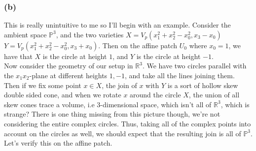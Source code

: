 \documentclass{article}
\theoremstyle{definition}
\newcommand{\R}{\mathbb{R}}
\renewcommand{\P}{\mathbb{P}}
\newcommand{\PP}[1]{\P^{#1}}
\begin{document}
\subsubsection*{(b)}

This is really unintuitive to me so I'll begin with an example. Consider the
ambient space $\PP{3}$, and the two varieties $X = V_p(x_1^2 + x_2^2 - x_0^2,
x_3 - x_0)$ $Y = V_p(x_1^2 + x_2^2 - x_0^2, x_3 + x_0)$. Then on the affine
patch $U_0$ where $x_0 = 1$, we have that $X$ is the circle at height $1$, and
$Y$ is the circle at height $-1$. \\

Now consider the geometry of our setup in $\R^{3}$. We have two circles
parallel with the $x_1x_2$-plane at different heights $1, -1$, and take all the
lines joining them. Then if we fix some point $x \in X$, the join of $x$ with
$Y$ is a sort of hollow skew double sided cone, and when we rotate $x$ around
the circle $X$, the union of all skew cones trace a volume, i.e $3$-dimensional
space, which isn't all of $\R^3$, which is strange? There is one thing missing
from this picture though, we're not considering the entire complex circles.
Thus, taking all of the complex points into account on the circles as well, we
should expect that the resulting join is all of $\PP{3}$. Let's verify this on
the affine patch. \\
\end{document}
